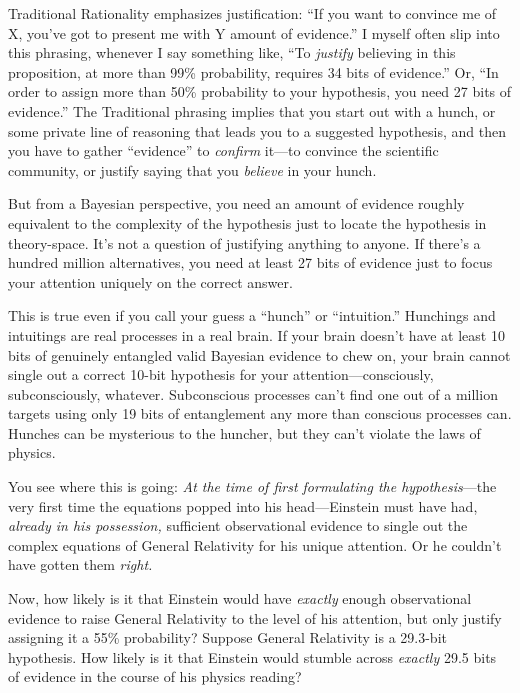 {
 Traditional Rationality emphasizes justification:
``If you want to convince me of X,
you've got to present me with Y amount of
evidence.'' I myself often slip into this phrasing,
whenever I say something like, ``To \textit{justify}
believing in this proposition, at more than 99\% probability, requires
34 bits of evidence.'' Or, ``In
order to assign more than 50\% probability to your hypothesis, you need
27 bits of evidence.'' The Traditional phrasing
implies that you start out with a hunch, or some private line of
reasoning that leads you to a suggested hypothesis, and then you have
to gather ``evidence'' to
\textit{confirm} it---to convince the scientific community, or justify
saying that you \textit{believe} in your hunch.}

{
 But from a Bayesian perspective, you need an amount of evidence
roughly equivalent to the complexity of the hypothesis just to locate
the hypothesis in theory-space. It's not a question of
justifying anything to anyone. If there's a hundred
million alternatives, you need at least 27 bits of evidence just to
focus your attention uniquely on the correct answer.}

{
 This is true even if you call your guess a
``hunch'' or
``intuition.'' Hunchings and
intuitings are real processes in a real brain. If your brain
doesn't have at least 10 bits of genuinely entangled
valid Bayesian evidence to chew on, your brain cannot single out a
correct 10-bit hypothesis for your attention---consciously,
subconsciously, whatever. Subconscious processes can't
find one out of a million targets using only 19 bits of entanglement
any more than conscious processes can. Hunches can be mysterious to the
huncher, but they can't violate the laws of physics.}

{
 You see where this is going: \textit{At the time of first
formulating the hypothesis}{}---the very first time the equations
popped into his head---Einstein must have had, \textit{already in his
possession,} sufficient observational evidence to single out the
complex equations of General Relativity for his unique attention. Or he
couldn't have gotten them \textit{right.}}

{
 Now, how likely is it that Einstein would have \textit{exactly}
enough observational evidence to raise General Relativity to the level
of his attention, but only justify assigning it a 55\% probability?
Suppose General Relativity is a 29.3-bit hypothesis. How likely is it
that Einstein would stumble across \textit{exactly} 29.5 bits of
evidence in the course of his physics reading?}

